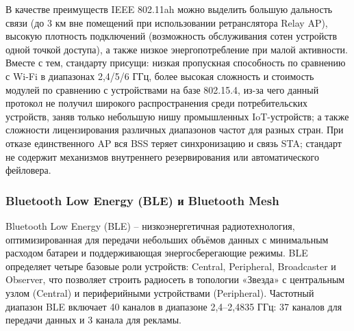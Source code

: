 \documentclass[14pt,a4paper]{extarticle}
\begin{document}
В качестве преимуществ IEEE 802.11ah можно выделить большую дальность связи (до 3 км вне помещений при использовании ретранслятора Relay AP), высокую плотность подключений (возможность
обслуживания сотен устройств одной точкой доступа), а также низкое энергопотребление при малой активности. Вместе с тем, стандарту присущи: низкая пропускная способность по сравнению
с Wi-Fi в диапазонах 2,4/5/6 ГГц, более высокая сложность и стоимость модулей по сравнению с устройствами на базе 802.15.4, из-за чего данный протокол не получил широкого
распространения среди потребительских устройств, заняв только небольшую нишу промышленных IoT-устройств; а также сложности лицензирования различных диапазонов частот для разных
стран.
При отказе единственного AP вся BSS теряет синхронизацию и связь STA; стандарт не содержит механизмов внутреннего резервирования или автоматического фейловера.


\subsubsection{Bluetooth Low Energy (BLE) и Bluetooth Mesh}

Bluetooth Low Energy (BLE) -- низкоэнергетичная радиотехнология, оптимизированная для передачи небольших объёмов данных с минимальным расходом батареи и поддерживающая энергосберегающие
режимы. BLE определяет четыре базовые роли устройств: Central, Peripheral, Broadcaster и Observer, что позволяет строить радиосеть в топологии «Звезда» с центральным узлом (Central) и периферийными устройствами (Peripheral).
Частотный диапазон BLE включает 40 каналов в диапазоне 2,4–2,4835 ГГц: 37 каналов для передачи данных и 3 канала для рекламы.
\end{document}
